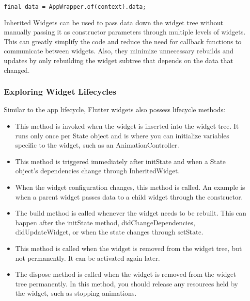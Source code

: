 \begin{lstlisting}
final data = AppWrapper.of(context).data;
\end{lstlisting}

\noindent Inherited Widgets can be used to pass data down the widget tree without manually passing it as constructor 
parameters through multiple levels of widgets. This can greatly simplify the code and reduce the need for callback 
functions to communicate between widgets. Also, they minimize unnecessary rebuilds and updates by only rebuilding the 
widget subtree that depends on the data that changed.


\newpage
\subsubsection{Exploring Widget Lifecycles}

Similar to the app lifecycle, Flutter widgets also possess lifecycle methods:

\begin{itemize}
  \item {} This method is invoked when the widget is inserted into the widget tree. It runs only once per 
  State object and is where you can initialize variables specific to the widget, such as an AnimationController.

  \item {} This method is triggered immediately after initState and when a State object's 
  dependencies change through InheritedWidget.

  \item {} When the widget configuration changes, this method is called. An example is when a 
  parent widget passes data to a child widget through the constructor.

  \item {} The build method is called whenever the widget needs to be rebuilt. This can happen after the 
  initState method, didChangeDependencies, didUpdateWidget, or when the state changes through setState.

  \item {} This method is called when the widget is removed from the widget tree, but not permanently. 
  It can be activated again later.

  \item {} The dispose method is called when the widget is removed from the widget tree permanently. 
  In this method, you should release any resources held by the widget, such as stopping animations.
\end{itemize}

